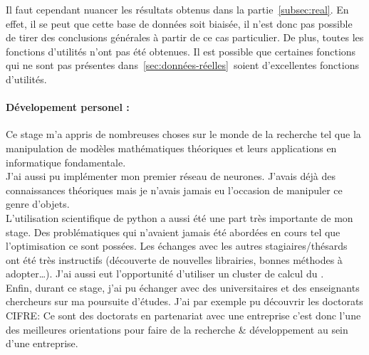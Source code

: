 
Il faut cependant nuancer les résultats obtenus dans la partie\ \ref{subsec:real}.
En effet, il se peut que cette base de données soit biaisée,
il n'est donc pas possible de tirer des conclusions générales à partir de ce cas particulier.
De plus, toutes les fonctions d'utilités n'ont pas été obtenues.
Il est possible que certaines fonctions qui ne sont pas présentes dans\ \ref{sec:données-réelles}\
soient d'excellentes fonctions d'utilités.


\paragraph{Dévelopement personel :\\}
Ce stage m'a appris de nombreuses choses sur le monde de la recherche tel
que la manipulation de modèles mathématiques théoriques et leurs applications
en informatique fondamentale.\\


J'ai aussi pu implémenter mon premier réseau de neurones.
J'avais déjà des connaissances théoriques mais je
n'avais jamais eu l'occasion de manipuler ce genre d'objets.\\


L'utilisation scientifique de python a aussi été une part très importante de mon stage.
Des problématiques qui n'avaient jamais été abordées en cours tel que l'optimisation ce sont possées.
Les échanges avec les autres stagiaires/thésards ont été très instructifs
(découverte de nouvelles librairies, bonnes méthodes à adopter\ldots).
J'ai aussi eut l'opportunité d'utiliser un cluster de calcul du \lri.\\


Enfin, durant ce stage, j'ai pu échanger avec des universitaires et des enseignants chercheurs
sur ma poursuite d'études.
J'ai par exemple pu découvrir les doctorats \textsc{CIFRE}\cite{cifre}:
Ce sont des doctorats en partenariat avec une entreprise c'est donc l'une des meilleures
orientations pour faire de la recherche & développement au sein d'une entreprise.
